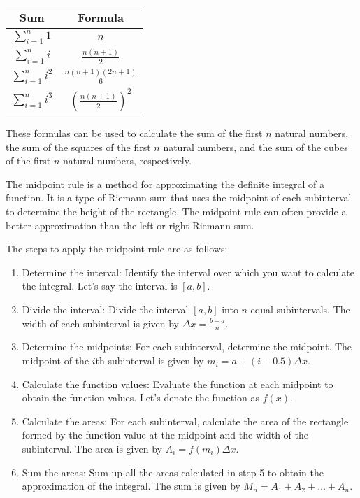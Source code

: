 \documentclass{article}
\begin{document}
\begin{tabular}{|c|c|}
\hline
Sum & Formula \\
\hline
$\sum_{i=1}^{n} 1$ & $n$ \\
\hline
$\sum_{i=1}^{n} i$ & $\frac{n(n+1)}{2}$ \\
\hline
$\sum_{i=1}^{n} i^2$ & $\frac{n(n+1)(2n+1)}{6}$ \\
\hline
$\sum_{i=1}^{n} i^3$ & $\left(\frac{n(n+1)}{2}\right)^2$ \\
\hline
\end{tabular}

These formulas can be used to calculate the sum of the first $n$ natural numbers, the sum of the squares of the first $n$ natural numbers, and the sum of the cubes of the first $n$ natural numbers, respectively.

The midpoint rule is a method for approximating the definite integral of a function. It is a type of Riemann sum that uses the midpoint of each subinterval to determine the height of the rectangle. The midpoint rule can often provide a better approximation than the left or right Riemann sum.

The steps to apply the midpoint rule are as follows:

\begin{enumerate}
\item Determine the interval: Identify the interval over which you want to calculate the integral. Let's say the interval is $[a, b]$.
\item Divide the interval: Divide the interval $[a, b]$ into $n$ equal subintervals. The width of each subinterval is given by $\Delta x = \frac{b - a}{n}$.
\item Determine the midpoints: For each subinterval, determine the midpoint. The midpoint of the $i$th subinterval is given by $m_i = a + (i - 0.5)\Delta x$.
\item Calculate the function values: Evaluate the function at each midpoint to obtain the function values. Let's denote the function as $f(x)$.
\item Calculate the areas: For each subinterval, calculate the area of the rectangle formed by the function value at the midpoint and the width of the subinterval. The area is given by $A_i = f(m_i)\Delta x$.
\item Sum the areas: Sum up all the areas calculated in step 5 to obtain the approximation of the integral. The sum is given by $M_n = A_1 + A_2 + \ldots + A_n$.
\end{enumerate}
\end{document}
